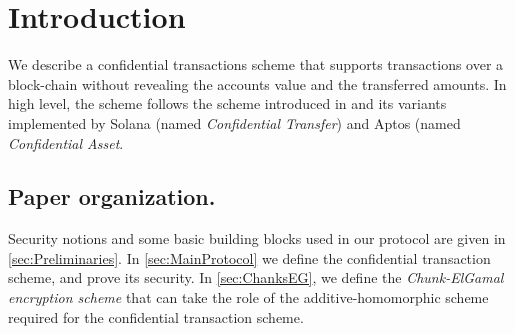 \section{Introduction}\label{sec:Introduction}
We describe a confidential transactions   scheme that supports transactions over  a block-chain without revealing the accounts value and the transferred amounts.   In high level, the scheme follows the  scheme  introduced  in \citet{BunzAZB20} and its  variants  implemented by Solana (named \textit{Confidential Transfer}) and Aptos (named \textit{Confidential Asset}.



\subsection*{Paper organization.} Security notions  and some  basic building blocks used in our protocol are given in \cref{sec:Preliminaries}. In \cref{sec:MainProtocol} we define the confidential transaction scheme, and prove its security.  
In \cref{sec:ChanksEG}, we define   the \textit{Chunk-ElGamal  encryption scheme} that can take the role of the additive-homomorphic scheme required for the confidential transaction scheme.